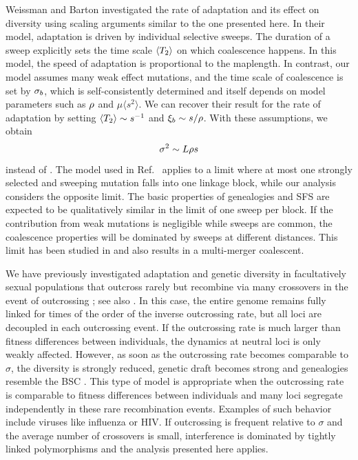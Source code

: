 Weissman and Barton \cite{weissman_limits_2012} investigated the rate of adaptation and
its effect on diversity using scaling arguments similar to the one
presented here. In their model, adaptation is driven by individual
selective sweeps. The duration of a sweep explicitly sets the
time scale $\langle T_2\rangle$ on which coalescence happens. In this model, the
speed of adaptation is proportional to the maplength. In
contrast, our model assumes many weak effect mutations, and the
time scale of coalescence is set by ${\sigma_b}$, which is
self-consistently determined and itself depends on model parameters
such as $\rho$ and $\mu \langle s^2\rangle$. We can
recover their result for the rate of adaptation by
setting  $\langle T_2\rangle\sim s^{-1}$ and ${\xi_b}
\sim s/\rho$. With these assumptions, we obtain
\begin{equation}
  \label{eq:weissman}
  \sigma^2 \sim L \xo s
\end{equation}
instead of . The model used in 
Ref.~\cite{weissman_limits_2012} applies to a limit where at most one
strongly selected and sweeping mutation falls into one linkage block,
while our analysis considers the opposite limit. The basic properties of
genealogies and SFS are expected to be qualitatively
similar in the limit of one sweep per block. If the contribution from
weak mutations is negligible while sweeps are common, the coalescence
properties will be dominated by sweeps at different distances. This
limit has been studied in \cite{Durrett:2005p40919} and also results in
a multi-merger coalescent.

We have previously investigated adaptation and genetic diversity in
facultatively sexual populations that outcross rarely but recombine via
many crossovers in the event of outcrossing
\cite{Neher:2010p30641,Neher:2011p42539}; see also
\cite{weissman_limits_2012}. In this case, the entire genome remains
fully linked for times of the order of the inverse outcrossing rate, but
all loci are decoupled in each outcrossing event.  If the outcrossing
rate is much larger than fitness differences between individuals, the
dynamics at neutral loci is only weakly affected. However, as soon as
the outcrossing rate becomes comparable to $\sigma$, the diversity is
strongly reduced, genetic draft becomes strong and genealogies resemble
the BSC \cite{Neher:2011p42539}. This type of model is appropriate when
the outcrossing rate is comparable to fitness differences between individuals and many loci
segregate independently in these rare recombination events. Examples of
such behavior include viruses like influenza or HIV. If outcrossing is
frequent relative to $\sigma$ and the average number of crossovers is
small, interference is dominated by tightly linked polymorphisms and the
analysis presented here applies.



